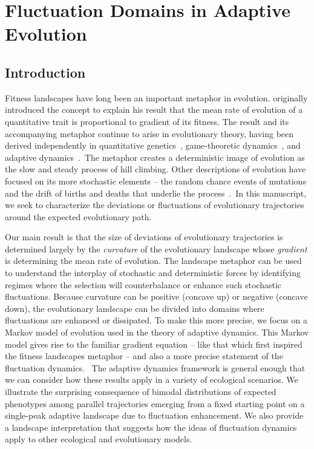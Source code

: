 

\chapter{Fluctuation Domains in Adaptive Evolution}\label{fluctuationdomains}

\section{Introduction}
Fitness landscapes have long been an important metaphor in evolution.
\citet{Wright31} originally introduced the concept to explain his
result that the mean rate of evolution of a quantitative trait
is proportional to gradient of its fitness. The result and its
accompanying metaphor continue to arise in evolutionary theory, having
been derived independently in quantitative genetics~\citep{Lande79},
game-theoretic dynamics~\citep{hofbauer_book1998, Abrams93}, and
adaptive dynamics~\citep{dieckmann_jmb1996}. The metaphor creates a
deterministic image of evolution as the slow and steady process of hill
climbing. Other descriptions of evolution have focused on its more
stochastic elements -- the random chance events of mutations and the drift
of births and deaths that underlie the process~\citep{kimura_book1984,
kimura1968, ohta_pnas2002}. In this manuscript, we seek to characterize
the deviations or fluctuations of evolutionary trajectories around the
expected evolutionary path.

Our main result is that the size of deviations of evolutionary
trajectories is determined largely by the \emph{curvature} of the
evolutionary landscape whose \emph{gradient} is determining the mean
rate of evolution. The landscape metaphor can be used to understand
the interplay of stochastic and deterministic forces by identifying
regimes where the selection will counterbalance or enhance such stochastic
fluctuations. Because curvature can be positive (concave up) or negative
(concave down), the evolutionary landscape can be divided into domains
where fluctuations are enhanced or dissipated. To make this more
precise, we focus on a Markov model of evolution used in the theory of
adaptive dynamics. This Markov model gives rise to the familiar gradient
equation -- like that which first inspired the fitness landscapes metaphor
-- and also a more precise statement of the fluctuation dynamics.  The
adaptive dynamics framework is general enough that we can consider how
these results apply in a variety of ecological scenarios.  We illustrate
the surprising consequence of bimodal distributions of expected
phenotypes among parallel trajectories emerging from a fixed starting
point on a single-peak adaptive landscape due to fluctuation enhancement.
We also provide a landscape interpretation that suggests how the ideas
of fluctuation dynamics apply to other ecological and evolutionary models.

